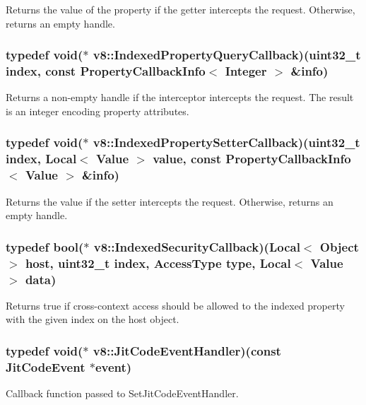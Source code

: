 Returns the value of the property if the getter intercepts the request. Otherwise, returns an empty handle. \hypertarget{namespacev8_af3c68ca291993f86484012c6789e2d6b}{
\subsubsection[{Indexed\-Property\-Query\-Callback}]{\setlength{\rightskip}{0pt plus 5cm}typedef void($\ast$ v8\-::\-Indexed\-Property\-Query\-Callback)(uint32\-\_\-t index, const {\bf Property\-Callback\-Info}$<$ {\bf Integer} $>$ \&info)}}\label{namespacev8_af3c68ca291993f86484012c6789e2d6b}
Returns a non-\/empty handle if the interceptor intercepts the request. The result is an integer encoding property attributes. \hypertarget{namespacev8_a15b00cf8b0a84a46c7f3b3bc807fb901}{
\subsubsection[{Indexed\-Property\-Setter\-Callback}]{\setlength{\rightskip}{0pt plus 5cm}typedef void($\ast$ v8\-::\-Indexed\-Property\-Setter\-Callback)(uint32\-\_\-t index, {\bf Local}$<$ {\bf Value} $>$ value, const {\bf Property\-Callback\-Info}$<$ {\bf Value} $>$ \&info)}}\label{namespacev8_a15b00cf8b0a84a46c7f3b3bc807fb901}
Returns the value if the setter intercepts the request. Otherwise, returns an empty handle. \hypertarget{namespacev8_ad216c79f4f23bceefdb1469ad4ee65cd}{
\subsubsection[{Indexed\-Security\-Callback}]{\setlength{\rightskip}{0pt plus 5cm}typedef bool($\ast$ v8\-::\-Indexed\-Security\-Callback)({\bf Local}$<$ {\bf Object} $>$ host, uint32\-\_\-t index, {\bf Access\-Type} type, {\bf Local}$<$ {\bf Value} $>$ data)}}\label{namespacev8_ad216c79f4f23bceefdb1469ad4ee65cd}
Returns true if cross-\/context access should be allowed to the indexed property with the given index on the host object. \hypertarget{namespacev8_a20e628e93f848c3350dcd4e49992bae6}{
\subsubsection[{Jit\-Code\-Event\-Handler}]{\setlength{\rightskip}{0pt plus 5cm}typedef void($\ast$ v8\-::\-Jit\-Code\-Event\-Handler)(const {\bf Jit\-Code\-Event} $\ast$event)}}\label{namespacev8_a20e628e93f848c3350dcd4e49992bae6}
Callback function passed to Set\-Jit\-Code\-Event\-Handler.


